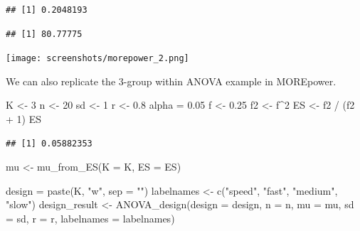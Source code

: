 \documentclass[
]{book}
\newenvironment{Shaded}{\begin{snugshade}}{\end{snugshade}}
\newcommand{\AttributeTok}[1]{\textcolor[rgb]{0.77,0.63,0.00}{#1}}
\newcommand{\DecValTok}[1]{\textcolor[rgb]{0.00,0.00,0.81}{#1}}
\newcommand{\FloatTok}[1]{\textcolor[rgb]{0.00,0.00,0.81}{#1}}
\newcommand{\FunctionTok}[1]{\textcolor[rgb]{0.00,0.00,0.00}{#1}}
\newcommand{\NormalTok}[1]{#1}
\newcommand{\OtherTok}[1]{\textcolor[rgb]{0.56,0.35,0.01}{#1}}
\newcommand{\SpecialCharTok}[1]{\textcolor[rgb]{0.00,0.00,0.00}{#1}}
\newcommand{\StringTok}[1]{\textcolor[rgb]{0.31,0.60,0.02}{#1}}
\begin{document}
\begin{verbatim}
## [1] 0.2048193
\end{verbatim}

\begin{Shaded}
\end{Shaded}

\begin{verbatim}
## [1] 80.77775
\end{verbatim}

\texttt{[image: screenshots/morepower\_2.png]}

We can also replicate the 3-group within ANOVA example in MOREpower.

\begin{Shaded}
\begin{Highlighting}[]
\NormalTok{K }\OtherTok{\textless{}{-}} \DecValTok{3}
\NormalTok{n }\OtherTok{\textless{}{-}} \DecValTok{20}
\NormalTok{sd }\OtherTok{\textless{}{-}} \DecValTok{1}
\NormalTok{r }\OtherTok{\textless{}{-}} \FloatTok{0.8}
\NormalTok{alpha }\OtherTok{=} \FloatTok{0.05}
\NormalTok{f }\OtherTok{\textless{}{-}} \FloatTok{0.25}
\NormalTok{f2 }\OtherTok{\textless{}{-}}\NormalTok{ f}\SpecialCharTok{\^{}}\DecValTok{2}
\NormalTok{ES }\OtherTok{\textless{}{-}}\NormalTok{ f2 }\SpecialCharTok{/}\NormalTok{ (f2 }\SpecialCharTok{+} \DecValTok{1}\NormalTok{)}
\NormalTok{ES}
\end{Highlighting}
\end{Shaded}

\begin{verbatim}
## [1] 0.05882353
\end{verbatim}

\begin{Shaded}
\begin{Highlighting}[]
\NormalTok{mu }\OtherTok{\textless{}{-}} \FunctionTok{mu\_from\_ES}\NormalTok{(}\AttributeTok{K =}\NormalTok{ K, }\AttributeTok{ES =}\NormalTok{ ES)}

\NormalTok{design }\OtherTok{=} \FunctionTok{paste}\NormalTok{(K, }\StringTok{"w"}\NormalTok{, }\AttributeTok{sep =} \StringTok{""}\NormalTok{)}
\NormalTok{labelnames }\OtherTok{\textless{}{-}} \FunctionTok{c}\NormalTok{(}\StringTok{"speed"}\NormalTok{, }\StringTok{"fast"}\NormalTok{, }\StringTok{"medium"}\NormalTok{, }\StringTok{"slow"}\NormalTok{)}
\NormalTok{design\_result }\OtherTok{\textless{}{-}} \FunctionTok{ANOVA\_design}\NormalTok{(}\AttributeTok{design =}\NormalTok{ design,}
                   \AttributeTok{n =}\NormalTok{ n, }
                   \AttributeTok{mu =}\NormalTok{ mu, }
                   \AttributeTok{sd =}\NormalTok{ sd, }
                   \AttributeTok{r =}\NormalTok{ r, }
                   \AttributeTok{labelnames =}\NormalTok{ labelnames)}
\end{Highlighting}
\end{Shaded}
\end{document}
